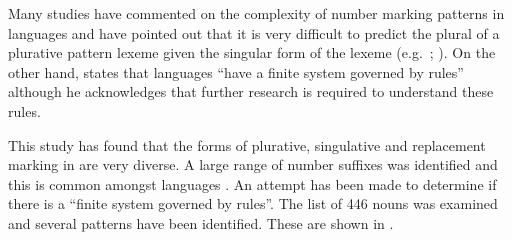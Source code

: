 \documentclass[output=paper]{langsci/langscibook}
\begin{document}
Many studies have commented on the complexity of number marking patterns in  languages and have pointed out that it is very difficult to predict the plural of a plurative pattern lexeme given the singular form of the lexeme (e.g.\ \citealt[4]{TuckerMpaayei1955}; \citealt[3]{HildersLawrance1957}). On the other hand, \citet[255]{Dimmendaal2000} states that  languages “have a finite system governed by rules” although he acknowledges that further research is required to understand these rules. 

This study has found that the forms of plurative, singulative and replacement marking in  are very diverse. A large range of number suffixes was identified and this is common amongst  languages \citep[219]{Dimmendaal2000}. An attempt has been made to determine if there is a “finite system governed by rules”. The list of 446 nouns was examined and several patterns have been identified. These are shown in . 

\begin{table}[t]
\caption{Patterns for singular and plural formation}
\label{tab:moodie:9}
\end{table}
\end{document}
